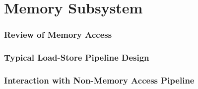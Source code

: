 \section{Memory Subsystem}

\begin{frame}
    \frametitle{Review of Memory Access}

\end{frame}


\begin{frame}
    \frametitle{Typical Load-Store Pipeline Design}

\end{frame}

\begin{frame}
    \frametitle{Interaction with Non-Memory Access Pipeline}

\end{frame}

